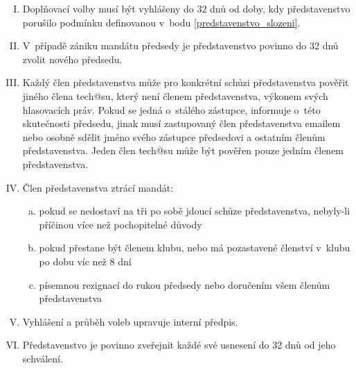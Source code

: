 \documentclass[10pt]{article}
\begin{document}
\begin{enumerate}[I.]
	\item Doplňovací volby musí být vyhlášeny do 32 dnů od doby, kdy představenstvo porušilo podmínku definovanou v~bodu \ref{predstavenstvo_slozeni}.
	\item V~případě zániku mandátu předsedy je představenstvo povinno do 32 dnů zvolit nového předsedu.
	\item \label{povereni} Každý člen představenstva může pro konkrétní schůzi představenstva pověřit jiného člena tech@su, který není členem představenstva, výkonem svých hlasovacích práv. Pokud se jedná o~stálého zástupce, informuje o~této skutečnosti předsedu, jinak musí zastupovaný člen představenstva emailem nebo osobně sdělit jméno svého zástupce předsedovi a ostatním členům představenstva. Jeden člen tech@su může být pověřen pouze jedním členem představenstva.  
	\item Člen představenstva ztrácí mandát:
		\begin{enumerate}[a.]
		\item pokud se nedostaví na tři po sobě jdoucí schůze představenstva, nebyly-li příčinou více než pochopitelné důvody
		\item pokud přestane být členem klubu, nebo má pozastavené členství v~klubu po dobu víc než 8 dní
		\item písemnou rezignací do rukou předsedy nebo doručením všem členům představenstva
		\end{enumerate}
	\item Vyhlášení a průběh voleb upravuje interní předpis. 
	\item Představenstvo je povinno zveřejnit každé své usnesení do 32 dnů od jeho schválení.
	\end{enumerate}
\end{document}
